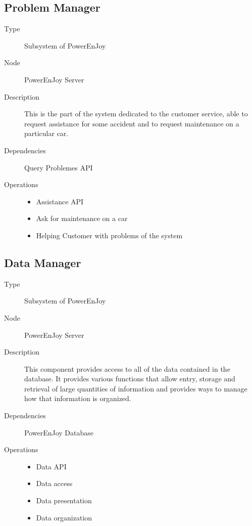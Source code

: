 \subsection{Problem Manager}
\begin{description}
	\item[Type] Subsystem of PowerEnJoy
	\item[Node] PowerEnJoy Server
	\item[Description] This is the part of the system dedicated to the customer service, able to request assistance for some accident and to request maintenance on a particular car.
	\item[Dependencies] Query Problemes API
	\item[Operations] 
		\begin{itemize}
			\item Assistance API
			\item Ask for maintenance on a car
			\item Helping Customer with problems of the system
	\end{itemize}
\end{description}

\subsection{Data Manager}
\begin{description}
	\item[Type] Subsystem of PowerEnJoy
	\item[Node] PowerEnJoy Server
	\item[Description] This component provides access to all of the data contained in the database. It provides various functions that allow entry, storage and retrieval of large quantities of information and provides ways to manage how that information is organized.
	\item[Dependencies] PowerEnJoy Database
	\item[Operations] 
		\begin{itemize}
			\item Data API
			\item Data access
			\item Data presentation 
			\item Data organization
		\end{itemize}
\end{description}
